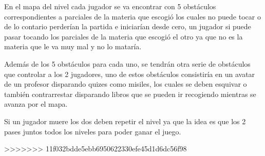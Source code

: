 \documentclass{article}
\begin{document}
En el mapa del nivel cada jugador se va encontrar con 5 obstáculos correspondientes a parciales de la materia que escogió los cuales no puede tocar o de lo contario perderían la partida e iniciarían desde cero, un jugador si puede pasar tocando los parciales de la materia que escogió el otro ya que no es la materia que le va muy mal y no lo mataría.

Además de los 5 obstáculos para cada uno, se tendrán otra serie de obstáculos que controlar a los 2 jugadores, uno de estos obstáculos consistiría en un avatar de un profesor disparando quizes como misiles, los cuales se deben esquivar o también contrarrestar disparando libros que se pueden ir recogiendo mientras se avanza por el mapa.

Si un jugador muere los dos deben repetir el nivel ya que la idea es que los 2 pases juntos todos los niveles para poder ganar el juego.

>>>>>>> 11f032bdde5ebb6950622330efe45d1d6dc56f98
\end{document}
